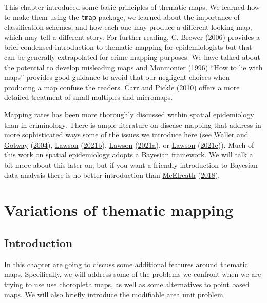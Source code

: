 \documentclass[
]{book}
\begin{document}
This chapter introduced some basic principles of thematic maps. We learned how to make them using the \texttt{tmap} package, we learned about the importance of classification schemes, and how each one may produce a different looking map, which may tell a different story. For further reading, \protect\hyperlink{ref-Brewer_2006}{C. Brewer} (\protect\hyperlink{ref-Brewer_2006}{2006}) provides a brief condensed introduction to thematic mapping for epidemiologists but that can be generally extrapolated for crime mapping purposes. We have talked about the potential to develop misleading maps and \protect\hyperlink{ref-Monmonier_1996}{Monmonier} (\protect\hyperlink{ref-Monmonier_1996}{1996}) ``How to lie with maps'' provides good guidance to avoid that our negligent choices when producing a map confuse the readers. \protect\hyperlink{ref-Carr_2010}{Carr and Pickle} (\protect\hyperlink{ref-Carr_2010}{2010}) offers a more detailed treatment of small multiples and micromaps.

Mapping rates has been more thoroughly discussed within spatial epidemiology than in criminology. There is ample literature on disease mapping that address in more sophisticated ways some of the issues we introduce here (see \protect\hyperlink{ref-Waller_2004}{Waller and Gotway} (\protect\hyperlink{ref-Waller_2004}{2004}), \protect\hyperlink{ref-Lawson_2006}{Lawson} (\protect\hyperlink{ref-Lawson_2006}{2021b}), \protect\hyperlink{ref-Lawson_2021a}{Lawson} (\protect\hyperlink{ref-Lawson_2021a}{2021a}), or \protect\hyperlink{ref-Lawson_2021b}{Lawson} (\protect\hyperlink{ref-Lawson_2021b}{2021c})). Much of this work on spatial epidemiology adopts a Bayesian framework. We will talk a bit more about this later on, but if you want a friendly introduction to Bayesian data analysis there is no better introduction than \protect\hyperlink{ref-McElreath_2018}{McElreath} (\protect\hyperlink{ref-McElreath_2018}{2018}).

\hypertarget{variations-of-thematic-mapping}{%
\chapter{Variations of thematic mapping}\label{variations-of-thematic-mapping}}

\hypertarget{introduction-3}{%
\section{Introduction}\label{introduction-3}}

In this chapter are going to discuss some additional features around thematic maps. Specifically, we will address some of the problems we confront when we are trying to use use choropleth maps, as well as some alternatives to point based maps. We will also briefly introduce the modifiable area unit problem.
\end{document}
